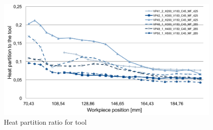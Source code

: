 	\begin{figure}[H]
		\centering
		\captionsetup{justification=centering}
		\includegraphics[scale=0.55]{Imagens/partTool.png}
		\caption{Heat partition ratio for tool}
		\label{fig:hpartTool}
	\end{figure}

